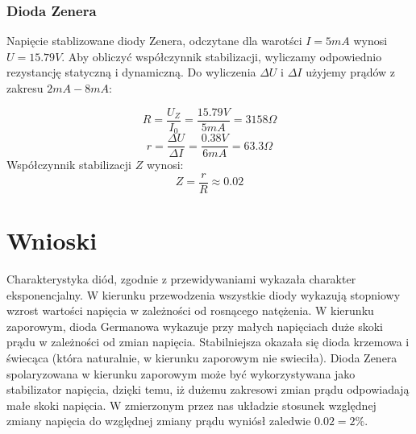 \documentclass[11pt]{article}
\begin{document}
\subsubsection{Dioda Zenera}
Napięcie stablizowane diody Zenera, odczytane dla warotści $I = 5mA$ wynosi $U = 15.79V$.
Aby obliczyć współczynnik stabilizacji, wyliczamy odpowiednio rezystancję statyczną i dynamiczną. Do wyliczenia $\Delta U$ i $\Delta I$ użyjemy prądów z zakresu $2mA-8mA$:

$$R = \frac{U_{Z}}{I_{0}} = \frac{15.79V}{5mA} = 3158\Omega$$
$$r = \frac{\Delta U}{\Delta I} = \frac{0.38V}{6mA} = 63.3\Omega$$
Współczynnik stabilizacji $Z$ wynosi:
$$Z = \frac{r}{R} \approx 0.02$$ 

\section{Wnioski}
Charakterystyka diód, zgodnie z przewidywaniami wykazała charakter eksponencjalny. W kierunku przewodzenia wszystkie diody wykazują stopniowy wzrost wartości napięcia w zależności od rosnącego natężenia. W kierunku zaporowym, dioda Germanowa wykazuje przy małych napięciach duże skoki prądu w zależności od zmian napięcia. Stabilniejsza okazała się dioda krzemowa i świecąca (która naturalnie, w kierunku zaporowym nie swieciła).
Dioda Zenera spolaryzowana w kierunku zaporowym może być wykorzystywana jako stabilizator napięcia, dzięki temu, iż dużemu zakresowi zmian prądu odpowiadają małe skoki napięcia. W zmierzonym przez nas układzie stosunek względnej zmiany napięcia do względnej zmiany prądu wyniósł zaledwie $0.02 = 2\%$.
\end{document}
